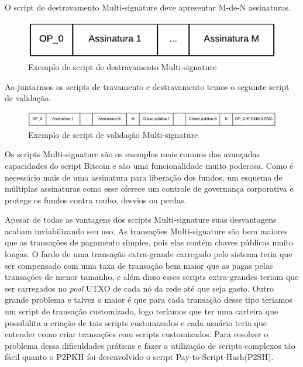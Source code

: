 \documentclass[conference,compsoc]{IEEEtran}
\begin{document}
O script de destravamento Multi-signature deve apresentar M-de-N assinaturas.

\begin{figure}[H]
    \centering
    \includegraphics[keepaspectratio=true, scale=0.75]{img/Multsig_script_destravamento.pdf}
    \caption{Exemplo de script de destravamento Multi-signature}
    \label{fig:Multi-signature_Destravamento}
\end{figure}

Ao juntarmos os scripts de travamento e destravamento temos o seguinte script de validação.

\begin{figure}[H]
    \centering
    \includegraphics[keepaspectratio=true, scale=0.45]{img/Multsig_script_validacao.pdf}
    \caption{Exemplo de script de validação Multi-signature}
    \label{fig:Multi-signature_validacao}
\end{figure}

Os scripts Multi-signature são os exemplos mais comuns das avançadas capacidades do script Bitcoin e são uma funcionalidade muito poderosa. Como é necessário mais de uma assinatura para liberação dos fundos, um esquema de múltiplas assinaturas como esse oferece um controle de governança corporativa e protege os fundos contra roubo, desvios ou perdas.

Apesar de todas as vantagens dos scripts Multi-signature suas desvantagens acabam inviabilizando seu uso. As transações Multi-signature são bem maiores que as transações de pagamento simples, pois elas contém chaves públicas muito longas. O fardo de uma transação extra-grande carregado pelo sistema teria que ser compensado com uma taxa de transação bem maior que as pagas pelas transações de menor tamanho, e além disso esses scripts extra-grandes teriam que ser carregados no \textit{pool} UTXO de cada nó da rede até que seja gasto. Outro grande problema e talvez o maior é que para cada transação desse tipo teriamos um script de transação customizado, logo teríamos que ter uma carteira que possibilita a criação de tais scripts customizados e cada usuário teria que entender como criar transações com scripts customizados. Para resolver o problema dessa dificuldades práticas e fazer a utilização de scripts complexos tão fácil quanto o P2PKH foi desenvolvido o script Pay-to-Script-Hash(P2SH).
\end{document}

